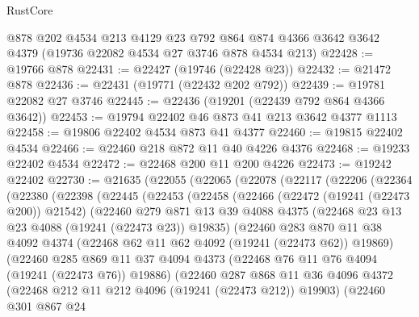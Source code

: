 \begin{lexlean}{RustCore}
\begin{coremodule}
    @878
    @202
    @4534
    @213
    @4129
    @23
    @792
    @864
    @874
    @4366
    @3642
    @3642
    @4379
    (@19736 @22082 @4534 @27 @3746 @878 @4534 @213)
@22428 := @19766 @878
@22431 := @22427 (@19746 (@22428 @23))
@22432 := @21472 @878
@22436 := @22431 (@19771 (@22432 @202 @792))
@22439 := @19781 @22082 @27 @3746
@22445 := @22436 (@19201 (@22439 @792 @864 @4366 @3642))
@22453 := @19794 @22402 @46 @873 @41 @213 @3642 @4377 @1113
@22458 := @19806 @22402 @4534 @873 @41 @4377
@22460 := @19815 @22402 @4534
@22466 := @22460 @218 @872 @11 @40 @4226 @4376
@22468 := @19233 @22402 @4534
@22472 := @22468 @200 @11 @200 @4226
@22473 := @19242 @22402
@22730 := @21635
    (@22055
      (@22065
        (@22078
          (@22117
            (@22206
              (@22364
                (@22380
                  (@22398
                    (@22445
                      (@22453
                        (@22458
                          (@22466
                            (@22472 (@19241 (@22473 @200)) @21542)
                            (@22460
                              @279
                              @871
                              @13
                              @39
                              @4088
                              @4375
                              (@22468 @23 @13 @23 @4088 (@19241 (@22473 @23)) @19835)
                              (@22460
                                @283
                                @870
                                @11
                                @38
                                @4092
                                @4374
                                (@22468 @62 @11 @62 @4092 (@19241 (@22473 @62)) @19869)
                                (@22460
                                  @285
                                  @869
                                  @11
                                  @37
                                  @4094
                                  @4373
                                  (@22468 @76 @11 @76 @4094 (@19241 (@22473 @76)) @19886)
                                  (@22460
                                    @287
                                    @868
                                    @11
                                    @36
                                    @4096
                                    @4372
                                    (@22468 @212 @11 @212 @4096 (@19241 (@22473 @212)) @19903)
                                    (@22460
                                      @301
                                      @867
                                      @24

\end{coremodule}
\end{lexlean}
